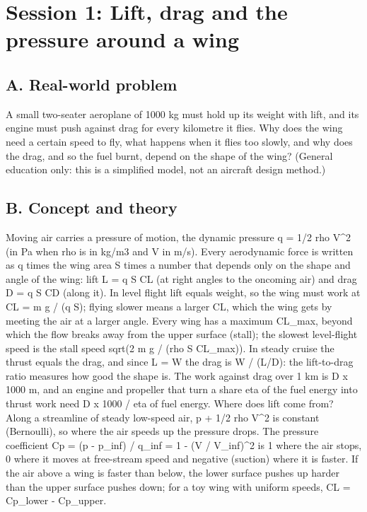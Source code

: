 \documentclass[11pt,a4paper]{article}
\begin{document}
\section{Session 1: Lift, drag and the pressure around a wing}

\subsection*{A. Real-world problem}
A small two-seater aeroplane of 1000 kg must hold up its weight with lift, and its engine must push against drag for every kilometre it flies. Why does the wing need a certain speed to fly, what happens when it flies too slowly, and why does the drag, and so the fuel burnt, depend on the shape of the wing? (General education only: this is a simplified model, not an aircraft design method.)

\subsection*{B. Concept and theory}
Moving air carries a pressure of motion, the dynamic pressure q = 1/2 rho V\textasciicircum{}2 (in Pa when rho is in kg/m3 and V in m/s). Every aerodynamic force is written as q times the wing area S times a number that depends only on the shape and angle of the wing: lift L = q S CL (at right angles to the oncoming air) and drag D = q S CD (along it). In level flight lift equals weight, so the wing must work at CL = m g / (q S); flying slower means a larger CL, which the wing gets by meeting the air at a larger angle. Every wing has a maximum CL\_max, beyond which the flow breaks away from the upper surface (stall); the slowest level-flight speed is the stall speed sqrt(2 m g / (rho S CL\_max)). In steady cruise the thrust equals the drag, and since L = W the drag is W / (L/D): the lift-to-drag ratio measures how good the shape is. The work against drag over 1 km is D x 1000 m, and an engine and propeller that turn a share eta of the fuel energy into thrust work need D x 1000 / eta of fuel energy. Where does lift come from? Along a streamline of steady low-speed air, p + 1/2 rho V\textasciicircum{}2 is constant (Bernoulli), so where the air speeds up the pressure drops. The pressure coefficient Cp = (p - p\_inf) / q\_inf = 1 - (V / V\_inf)\textasciicircum{}2 is 1 where the air stops, 0 where it moves at free-stream speed and negative (suction) where it is faster. If the air above a wing is faster than below, the lower surface pushes up harder than the upper surface pushes down; for a toy wing with uniform speeds, CL = Cp\_lower - Cp\_upper.
\end{document}
